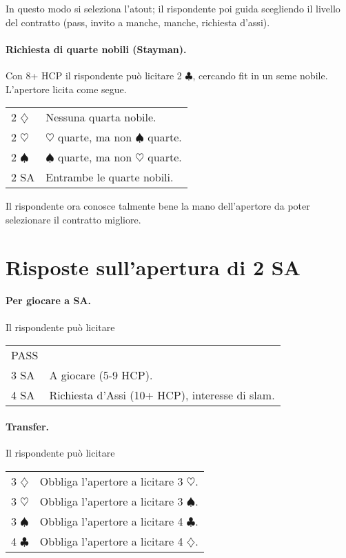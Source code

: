 \documentclass[a4paper,10pt]{article}
\renewcommand{\c}{$\clubsuit$\xspace}
\renewcommand{\d}{$\diamondsuit$\xspace}
\newcommand{\h}{$\heartsuit$\xspace}
\newcommand{\s}{$\spadesuit$\xspace}
\newcommand{\sa}{SA\xspace}
\newcommand{\smallspace}{\vskip0.3cm}
\newenvironment{twocol}
  {\smallspace\noindent\begin{tabular}{l p{0.78\textwidth}}}
  {\end{tabular}\smallspace}
\begin{document}
In questo modo si seleziona l'atout; il rispondente poi guida scegliendo il livello del contratto (pass, invito a manche, manche, richiesta d'assi).

\paragraph{Richiesta di quarte nobili (Stayman).} Con 8+ HCP il rispondente può licitare 2 \c, cercando fit in un seme nobile. L'apertore licita come segue.

\begin{twocol}
 2 \d & Nessuna quarta nobile.\\
 2 \h & \h quarte, ma non \s quarte.\\
 2 \s & \s quarte, ma non \h quarte.\\
 2 SA & Entrambe le quarte nobili.
\end{twocol}

Il rispondente ora conosce talmente bene la mano dell'apertore da poter selezionare il contratto migliore.

\section{Risposte sull'apertura di 2 \sa}

\paragraph{Per giocare a \sa.} Il rispondente può licitare

\begin{twocol}
 PASS & \\
 3 \sa & A giocare (5-9 HCP).\\
 4 \sa & Richiesta d'Assi (10+ HCP), interesse di slam.
\end{twocol}

\paragraph{Transfer.} Il rispondente può licitare

\begin{twocol}
 3 \d & Obbliga l'apertore a licitare 3 \h.\\
 3 \h & Obbliga l'apertore a licitare 3 \s.\\
 3 \s & Obbliga l'apertore a licitare 4 \c.\\
 4 \c & Obbliga l'apertore a licitare 4 \d.\\
\end{twocol}
\end{document}

